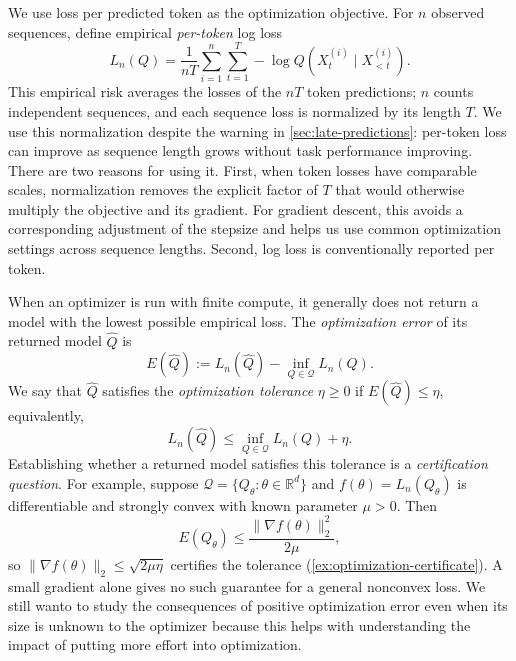\documentclass[11pt,twoside]{article}
\newcommand{\R}{\mathbb R}
\theoremstyle{definition}
\theoremstyle{remark}
\begin{document}
We use loss per predicted token as the optimization objective.
For \(n\) observed sequences, define empirical \emph{per-token}
log loss
\[
 L_n(Q)=\frac1{nT}\sum_{i=1}^n\sum_{t=1}^T
 -\log Q(X_t^{(i)}\mid X_{<t}^{(i)}).
\]
This empirical risk averages the losses of the \(nT\) token predictions;
\(n\) counts independent sequences, and each sequence loss is normalized
by its length \(T\).
We use this normalization despite the warning in
\cref{sec:late-predictions}: per-token loss can improve as sequence
length grows without task performance improving.
There are two reasons for using it. First, when token losses have
comparable scales, normalization removes the explicit factor of \(T\)
that would otherwise multiply the objective and its gradient.
For gradient descent, this avoids a corresponding adjustment of the
stepsize and helps us use common optimization settings across sequence
lengths. Second, log loss is conventionally reported per token.

When an optimizer is run with finite compute, it generally does not
return a model with the lowest possible empirical loss.
The \emph{optimization error} of its returned model \(\widehat Q\) is
\begin{equation}
 E(\widehat Q):=L_n(\widehat Q)
 -\inf_{Q\in\mathcal Q}L_n(Q).
 \label{eq:approximate-fit-error}
\end{equation}
We say that \(\widehat Q\) satisfies the \emph{optimization tolerance}
\(\eta\ge0\) if \(E(\widehat Q)\le\eta\), equivalently,
\begin{equation}
 L_n(\widehat Q)\le\inf_{Q\in\mathcal Q}L_n(Q)+\eta.
 \label{eq:approximate-fit}
\end{equation}
Establishing whether a returned model satisfies this tolerance is a
\emph{certification question}. For example, suppose
\(\mathcal Q=\{Q_\theta:\theta\in\R^d\}\) and
\(f(\theta)=L_n(Q_\theta)\) is differentiable and strongly convex
with known parameter \(\mu>0\). Then
\[
 E(Q_\theta)\le\frac{\|\nabla f(\theta)\|_2^2}{2\mu},
\]
so \(\|\nabla f(\theta)\|_2\le\sqrt{2\mu\eta}\) certifies the tolerance
(\cref{ex:optimization-certificate}). A small gradient alone gives no
such guarantee for a general nonconvex loss.
We still wanto to study the consequences of positive optimization error
even when its size is unknown to the optimizer because this helps with
understanding the impact of putting more effort into optimization.
\end{document}
